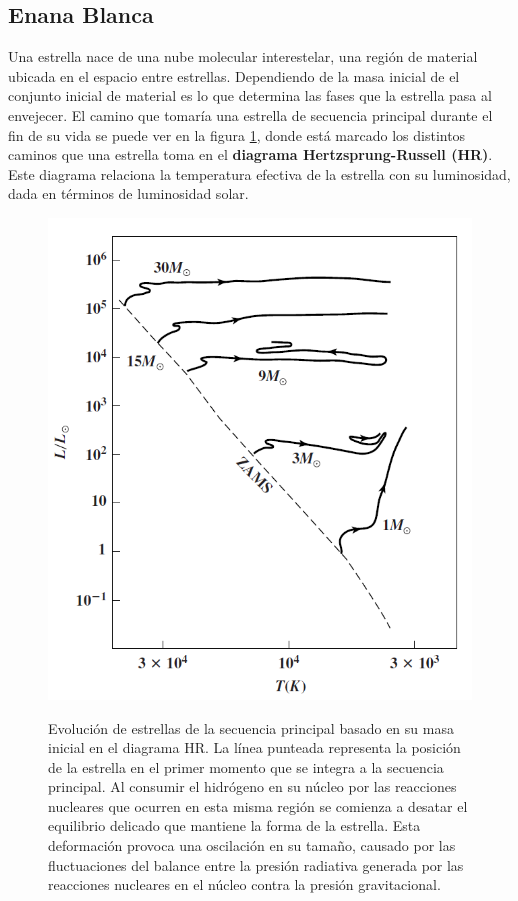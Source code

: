 \subsection*{Enana Blanca}

Una estrella nace de una nube molecular interestelar, una región de material
ubicada en el espacio entre estrellas. Dependiendo de la masa inicial de el
conjunto inicial de material es lo que determina las fases que la estrella pasa
al envejecer. El camino que tomaría una estrella de secuencia principal durante
el fin de su vida se puede ver en la figura \ref{evolucionMSEstrella}, donde
está marcado los distintos caminos que una estrella toma en el \textbf{diagrama
Hertzsprung-Russell (HR)}. Este diagrama relaciona la temperatura efectiva de la
estrella con su luminosidad, dada en términos de luminosidad solar.

\begin{figure}[!ht]
	\centering
	\includegraphics[scale=0.5]{Introduccion/Figures/Figura Evolucion_MS_Astronomy_Physical_Perspective.png}
	\caption{Evolución de estrellas de la secuencia principal basado en su masa
	inicial en el diagrama HR. La línea punteada representa la posición de la
	estrella en el primer momento que se integra a la secuencia principal. Al
	consumir el hidrógeno en su núcleo por las reacciones nucleares que ocurren
	en esta misma región se comienza a desatar el equilibrio delicado que
	mantiene la forma de la estrella. Esta deformación provoca una oscilación en
	su tamaño, causado por las fluctuaciones del balance entre la presión
	radiativa generada por las reacciones nucleares en el núcleo contra la
	presión gravitacional.}
	\citet{astronomyPhysicalPerspective_stellarOldAgeChapter}
	\label{evolucionMSEstrella}
\end{figure}

